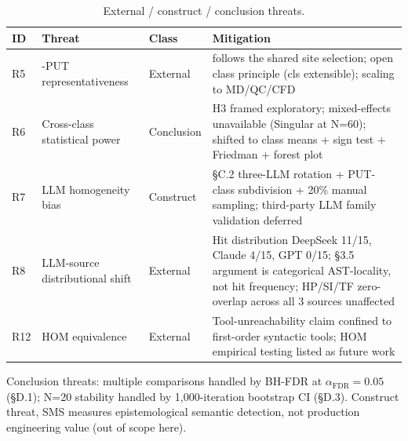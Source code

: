 \documentclass[review,12pt,authoryear]{elsarticle}
\begin{document}
{\def\LTcaptype{table} %
\begin{longtable}[]{@{}
  >{\raggedright\arraybackslash}p{}
  >{\raggedright\arraybackslash}p{}
  >{\raggedright\arraybackslash}p{}
  >{\raggedright\arraybackslash}p{}@{}}
\caption{External / construct / conclusion threats.}\label{tab:p2-28}\\
\toprule\noalign{}
\begin{minipage}[b]{\linewidth}\raggedright
ID
\end{minipage} & \begin{minipage}[b]{\linewidth}\raggedright
Threat
\end{minipage} & \begin{minipage}[b]{\linewidth}\raggedright
Class
\end{minipage} & \begin{minipage}[b]{\linewidth}\raggedright
Mitigation
\end{minipage} \\
\midrule\noalign{}
\endfirsthead
\endhead
\bottomrule\noalign{}
\endlastfoot
R5 & 12-PUT representativeness & External & follows the shared site selection;
open class principle (cls extensible); scaling to MD/QC/CFD \\
R6 & Cross-class statistical power & Conclusion & H3 framed exploratory;
mixed-effects unavailable (Singular at N=60); shifted to class means +
sign test + Friedman + forest plot \\
R7 & LLM homogeneity bias & Construct & §C.2 three-LLM rotation +
PUT-class subdivision + 20\% manual sampling; third-party LLM family
validation deferred \\
R8 & LLM-source distributional shift & External & Hit distribution
DeepSeek 11/15, Claude 4/15, GPT 0/15; §3.5 argument is categorical
AST-locality, not hit frequency; HP/SI/TF zero-overlap across all 3
sources unaffected \\
R12 & HOM equivalence & External & Tool-unreachability claim confined to
first-order syntactic tools; HOM empirical testing listed as future
work \\
\end{longtable}
}

Conclusion threats: multiple comparisons handled by BH-FDR at
$\alpha_{\mathrm{FDR}}=0.05$ (§D.1); N=20 stability handled by 1,000-iteration
bootstrap CI (§D.3). Construct threat, SMS measures epistemological
semantic detection, not production engineering value (out of scope here).
\end{document}

